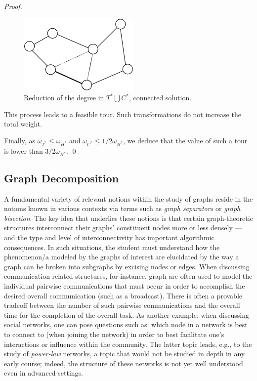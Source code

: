 \begin{proof}
\begin{figure}[hbt]
\begin{center}
       \includegraphics[scale=0.6]{FiguresGraph/christofides5}
       \caption{Reduction of the degree in $T^* \bigcup C^*$, connected solution.}
       \label{fig:christofidesFinalStep2}
\end{center}
\end{figure}

This process leads to a feasible tour. 
Such transformations do not increase the total weight.

Finally, 
as $\omega_{T^*} \leq \omega_{H^*}$ and $\omega_{C^*} \leq 1/2 \omega_{H^*}$,
we deduce that the value of such a tour is lower than $3/2 \omega_{H^*}$.
\qed
\end{proof}




\subsection{Graph Decomposition}
\label{sec:graph-decompose}


A fundamental variety of relevant notions within the study of graphs
reside in the notions known in various contexts via terms such as {\em
  graph separators} or {\em graph bisection}.  The key idea that
underlies these notions is that certain graph-theoretic structures
interconnect their graphs' constituent nodes more or less densely ---
and the type and level of interconnectivity has important algorithmic
consequences.  In such situations, the student must understand how the
phenomenon/a modeled by the graphs of interest are elucidated by the
way a graph can be broken into subgraphs by excising nodes or edges.
When discussing communication-related structures, for instance, graph
are often used to model the individual pairwise communications that
must occur in order to accomplish the desired overall communication
(such as a broadcast).  There is often a provable tradeoff between the
number of such pairwise communications and the overall time for the
completion of the overall task.  As another example, when discussing
social networks, one can pose questions such as: which node in a
network is best to connect to (when joining the network) in order to
best facilitate one's interactions or influence within the community.
The latter topic leads, e.g., to the study of {\em power-law}
networks, a topic that would not be studied in depth in any early
course; indeed, the structure of these networks is not yet well
understood even in advanced settings.

